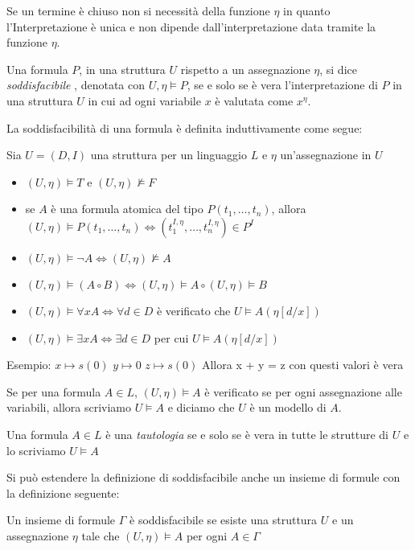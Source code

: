 Se un termine è chiuso non si necessità della funzione $\eta$ in quanto l'Interpretazione
è unica e non dipende dall'interpretazione data tramite la funzione $\eta$.

Una formula $P$, in una struttura $U$ rispetto a un assegnazione $\eta$, si dice \emph{soddisfacibile}
, denotata con $U,\eta \models P$, se e solo se è vera l'interpretazione di $P$
in una struttura $U$ in cui ad ogni variabile $x$ è valutata come $x^{\eta}$.

La soddisfacibilità di una formula è definita induttivamente come segue:
\begin{defi}
    Sia $U = (D,I)$ una struttura per un linguaggio $L$ e $\eta$ un'assegnazione in $U$
    \begin{itemize}
        \item $(U,\eta) \models T$ e $(U,\eta) \not \models F$
        \item se $A$ è una formula atomica del tipo $P(t_1,\dots,t_n)$, allora
              $(U,\eta) \models P(t_1,\dots,t_n) \iff (t_1^{I,\eta},\dots,t_n^{I,\eta}) \in P^I$
        \item $(U,\eta) \models \neg A \iff (U,\eta) \not \models A$
        \item $(U,\eta) \models (A \circ B) \iff (U,\eta) \models A \circ (U,\eta) \models B$
        \item $(U,\eta) \models \forall x A \iff \forall d \in D$ è verificato che $U \models A(\eta[d/x])$
        \item $(U,\eta) \models \exists x A \iff \exists d \in D$ per cui $U \models A(\eta[d/x])$
    \end{itemize}
\end{defi}

Esempio:
$x \mapsto s(0)$
$y \mapsto 0$
$z \mapsto s(0)$
Allora x + y = z con questi valori è vera

\begin{defi}
    Se per una formula $A \in L$, $(U,\eta) \models A$ è verificato se per ogni
    assegnazione alle variabili, allora scriviamo $U \models A$ e diciamo che $U$
    è un modello di $A$.
\end{defi}

\begin{defi}
Una formula $A \in L$ è una \emph{tautologia} se e solo se è vera in tutte le strutture
di $U$ e lo scriviamo $U \models A$
\end{defi}

Si può estendere la definizione di soddisfacibile anche un insieme di formule con
la definizione seguente:
\begin{defi}
Un insieme di formule $\Gamma$ è soddisfacibile se esiste una struttura $U$ e un
assegnazione $\eta$ tale che $(U,\eta) \models A$ per ogni $A \in \Gamma$
\end{defi}

